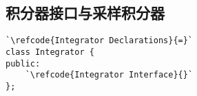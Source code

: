 \subsection{积分器接口与采样积分器}\label{sub:积分器接口与采样积分器}

\label{code:overview_Integrator}
\begin{lstlisting}
`\refcode{Integrator Declarations}{=}`
class Integrator {
public:
    `\refcode{Integrator Interface}{}`
};
\end{lstlisting}